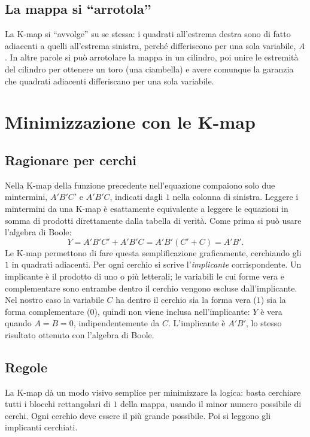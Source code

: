 \documentclass[11pt,a4paper]{article}
\begin{document}
\subsection{La mappa si ``arrotola''}

La K-map si ``avvolge'' su se stessa: i quadrati all'estrema destra sono di fatto adiacenti a quelli all'estrema sinistra, perché differiscono per una sola variabile, $A$. In altre parole si può arrotolare la mappa in un cilindro, poi unire le estremità del cilindro per ottenere un toro (una ciambella) e avere comunque la garanzia che quadrati adiacenti differiscano per una sola variabile.

\section{Minimizzazione con le K-map}

\subsection{Ragionare per cerchi}

Nella K-map della funzione precedente nell'equazione compaiono solo due mintermini, $A'B'C'$ e $A'B'C$, indicati dagli $1$ nella colonna di sinistra. Leggere i mintermini da una K-map è esattamente equivalente a leggere le equazioni in somma di prodotti direttamente dalla tabella di verità. Come prima si può usare l'algebra di Boole:
\[
Y = A'B'C' + A'B'C = A'B'(C' + C) = A'B'.
\]
Le K-map permettono di fare questa semplificazione graficamente, cerchiando gli $1$ in quadrati adiacenti. Per ogni cerchio si scrive l'\emph{implicante} corrispondente. Un implicante è il prodotto di uno o più letterali; le variabili le cui forme vera e complementare sono entrambe dentro il cerchio vengono escluse dall'implicante. Nel nostro caso la variabile $C$ ha dentro il cerchio sia la forma vera ($1$) sia la forma complementare ($0$), quindi non viene inclusa nell'implicante: $Y$ è vera quando $A = B = 0$, indipendentemente da $C$. L'implicante è $A'B'$, lo stesso risultato ottenuto con l'algebra di Boole.

\subsection{Regole}

La K-map dà un modo visivo semplice per minimizzare la logica: basta cerchiare tutti i blocchi rettangolari di $1$ della mappa, usando il minor numero possibile di cerchi. Ogni cerchio deve essere il più grande possibile. Poi si leggono gli implicanti cerchiati.
\end{document}
